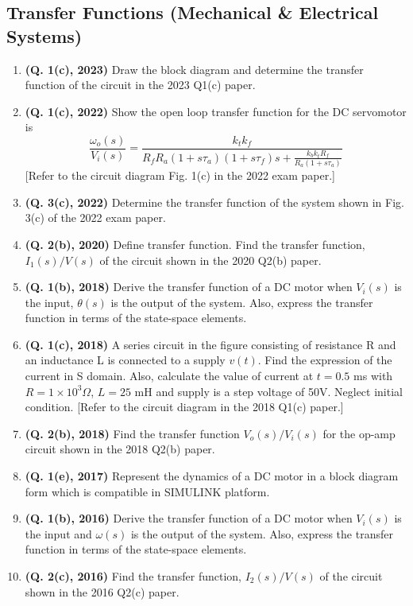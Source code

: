 \documentclass[12pt, a4paper]{article}
\begin{document}
	\subsection{Transfer Functions (Mechanical \& Electrical Systems)}
	\begin{enumerate}
		\item \textbf{(Q. 1(c), 2023)} Draw the block diagram and determine the transfer function of the circuit in the 2023 Q1(c) paper.
		\item \textbf{(Q. 1(c), 2022)} Show the open loop transfer function for the DC servomotor is 
		\[ \frac{\omega_o(s)}{V_i(s)} = \frac{k_t k_f}{R_f R_a (1+s\tau_a)(1+s\tau_f)s + \frac{k_b k_t R_f}{R_a(1+s\tau_a)}} \]
		[Refer to the circuit diagram Fig. 1(c) in the 2022 exam paper.]
		\item \textbf{(Q. 3(c), 2022)} Determine the transfer function of the system shown in Fig. 3(c) of the 2022 exam paper.
		\item \textbf{(Q. 2(b), 2020)} Define transfer function. Find the transfer function, $I_1(s)/V(s)$ of the circuit shown in the 2020 Q2(b) paper.
		\item \textbf{(Q. 1(b), 2018)} Derive the transfer function of a DC motor when $V_i(s)$ is the input, $\theta(s)$ is the output of the system. Also, express the transfer function in terms of the state-space elements.
		\item \textbf{(Q. 1(c), 2018)} A series circuit in the figure consisting of resistance R and an inductance L is connected to a supply $v(t)$. Find the expression of the current in S domain. Also, calculate the value of current at $t = 0.5$ ms with $R = 1 \times 10^3 \Omega$, $L = 25$ mH and supply is a step voltage of 50V. Neglect initial condition. [Refer to the circuit diagram in the 2018 Q1(c) paper.]
		\item \textbf{(Q. 2(b), 2018)} Find the transfer function $V_o(s)/V_i(s)$ for the op-amp circuit shown in the 2018 Q2(b) paper.
		\item \textbf{(Q. 1(e), 2017)} Represent the dynamics of a DC motor in a block diagram form which is compatible in SIMULINK platform.
		\item \textbf{(Q. 1(b), 2016)} Derive the transfer function of a DC motor when $V_i(s)$ is the input and $\omega(s)$ is the output of the system. Also, express the transfer function in terms of the state-space elements.
		\item \textbf{(Q. 2(c), 2016)} Find the transfer function, $I_2(s)/V(s)$ of the circuit shown in the 2016 Q2(c) paper.

\end{enumerate}
\end{document}
